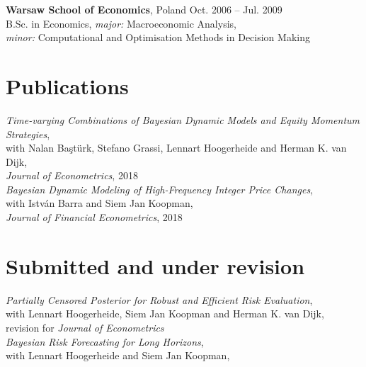 \documentclass[margin,line]{resume}
\begin{document}
\begin{resume}
\vspace{-1mm}

 	\textbf{Warsaw School of Economics}, Poland  \hfill Oct. 2006 --  Jul. 2009\\
   	B.Sc. in Economics, \textit{major:} Macroeconomic Analysis,\\ 
    \textit{minor:} Computational and Optimisation Methods in Decision Making\\
    
\vspace{-4mm}
\section{\mysidestyle Publications}
\textit{Time-varying Combinations of Bayesian Dynamic Models and Equity Momentum Strategies},\\
	with Nalan Ba\c{s}t\"{u}rk, Stefano Grassi, Lennart Hoogerheide and Herman K. van Dijk,\\
	\textit{Journal of Econometrics}, 2018 \vspace{1mm} \\
\textit{Bayesian Dynamic Modeling of High-Frequency Integer Price Changes},\\
	with Istv\'{a}n Barra  and Siem Jan Koopman,\\
	\textit{Journal of Financial Econometrics}, 2018  \vspace{-5mm} \\ 
	 	
\section{\mysidestyle Submitted and under revision}	
\textit{Partially Censored Posterior for Robust and Efficient Risk Evaluation},\\
	with Lennart Hoogerheide, Siem Jan Koopman and Herman K. van Dijk,\\
	revision for \textit{Journal of Econometrics} \vspace{1mm}\\ 
\textit{Bayesian Risk Forecasting for Long Horizons},\\
	with Lennart Hoogerheide and Siem Jan Koopman, \vspace{-5mm} \\ 
		 	

\end{resume}
\end{document}
